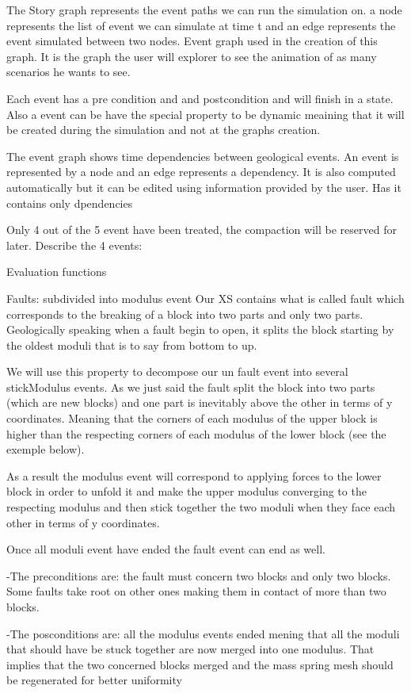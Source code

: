 \documentclass[12pt, a4paper]{memoir} %
\begin{document}
The Story graph represents the event paths we can run the simulation on. a node represents the list of event we can simulate at time t and an edge represents the event simulated between two nodes. Event graph used in the creation of this graph. It is the graph the user will explorer to see the animation of as many scenarios he wants to see.

Each event has a pre condition and and postcondition and will finish in a state.
Also a event can be have the special property to be dynamic meaining that it will be created during the simulation and not at 
the graphs creation.

The event graph shows time dependencies between geological events. An event is represented by a node and an edge represents a dependency. It is also computed automatically but it can be edited using information provided by the user. Has it contains only dpendencies

Only 4 out of the 5 event have been treated, the compaction will be reserved for later.
Describe the 4 events:

Evaluation functions

Faults: subdivided into modulus event
	Our XS contains what is called fault which corresponds to the breaking of a block into two parts and only two parts. Geologically speaking when a fault begin to open, it splits the block starting by the oldest moduli that is to say from bottom to up. 
	
	We will use this property to decompose our un fault event into several stickModulus events. As we just said the fault split the block into two parts (which are new blocks) and one part is inevitably above the other in terms of y coordinates. Meaning that the corners of each modulus of the upper block is higher than the respecting corners of each modulus of the lower block (see the exemple below). 
	
	As a result the modulus event will correspond to applying forces to the lower block in order to unfold it and make the upper modulus converging to the respecting modulus and then stick together the two moduli when they face each other in terms of y coordinates.
	
	Once all moduli event have ended the fault event can end as well.
	
	-The preconditions are: the fault must concern two blocks and only two blocks. Some faults take root on other ones making them in contact of more than two blocks. 
	
	-The posconditions are: all the modulus events ended mening that all the moduli that should have be stuck together are now merged into one modulus. That implies that the two concerned blocks merged and the mass spring mesh should be regenerated for better uniformity 
	
\end{document}
